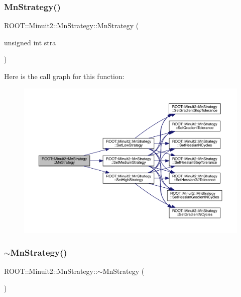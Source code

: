 \subsubsection{\texorpdfstring{MnStrategy()}{MnStrategy()}\hspace{0.1cm}{\footnotesize\ttfamily [2/6]}}
{\footnotesize\ttfamily R\+O\+O\+T\+::\+Minuit2\+::\+Mn\+Strategy\+::\+Mn\+Strategy (\begin{DoxyParamCaption}\item[{unsigned int}]{stra }\end{DoxyParamCaption})\hspace{0.3cm}{\ttfamily [explicit]}}

Here is the call graph for this function\+:\nopagebreak
\begin{figure}[H]
\begin{center}
\leavevmode
\includegraphics[width=350pt]{da/de4/classROOT_1_1Minuit2_1_1MnStrategy_ad70367966dc3b7cdf1be671acb3824d0_cgraph}
\end{center}
\end{figure}
\mbox{\label{classROOT_1_1Minuit2_1_1MnStrategy_a65ddda119cec991c9d07671c1a8af521}} 
\subsubsection{\texorpdfstring{$\sim$MnStrategy()}{~MnStrategy()}\hspace{0.1cm}{\footnotesize\ttfamily [1/3]}}
{\footnotesize\ttfamily R\+O\+O\+T\+::\+Minuit2\+::\+Mn\+Strategy\+::$\sim$\+Mn\+Strategy (\begin{DoxyParamCaption}{ }\end{DoxyParamCaption})\hspace{0.3cm}{\ttfamily [inline]}}

